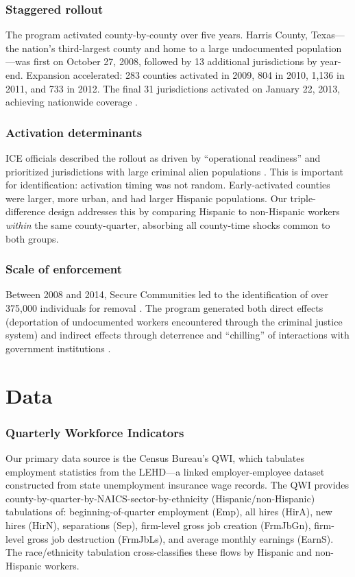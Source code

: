 \documentclass[12pt]{article}
\begin{document}
\subsubsection*{Staggered rollout} The program activated county-by-county over five years. Harris County, Texas---the nation's third-largest county and home to a large undocumented population---was first on October 27, 2008, followed by 13 additional jurisdictions by year-end. Expansion accelerated: 283 counties activated in 2009, 804 in 2010, 1,136 in 2011, and 733 in 2012. The final 31 jurisdictions activated on January 22, 2013, achieving nationwide coverage \citep{miles2014policing}.

\subsubsection*{Activation determinants} ICE officials described the rollout as driven by ``operational readiness'' and prioritized jurisdictions with large criminal alien populations \citep{cox2013policing}. This is important for identification: activation timing was not random. Early-activated counties were larger, more urban, and had larger Hispanic populations. Our triple-difference design addresses this by comparing Hispanic to non-Hispanic workers \textit{within} the same county-quarter, absorbing all county-time shocks common to both groups.

\subsubsection*{Scale of enforcement} Between 2008 and 2014, Secure Communities led to the identification of over 375,000 individuals for removal \citep{ice2014secure}. The program generated both direct effects (deportation of undocumented workers encountered through the criminal justice system) and indirect effects through deterrence and ``chilling'' of interactions with government institutions \citep{alsan2022fear}.


\section{Data}
\label{sec:data}

\subsubsection*{Quarterly Workforce Indicators} Our primary data source is the Census Bureau's QWI, which tabulates employment statistics from the LEHD---a linked employer-employee dataset constructed from state unemployment insurance wage records. The QWI provides county-by-quarter-by-NAICS-sector-by-ethnicity (Hispanic/non-Hispanic) tabulations of: beginning-of-quarter employment (Emp), all hires (HirA), new hires (HirN), separations (Sep), firm-level gross job creation (FrmJbGn), firm-level gross job destruction (FrmJbLs), and average monthly earnings (EarnS). The race/ethnicity tabulation cross-classifies these flows by Hispanic and non-Hispanic workers.
\end{document}

